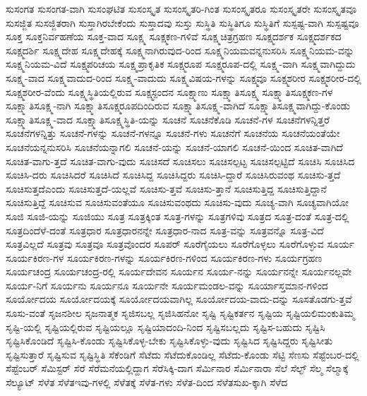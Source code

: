 {ಸುಸಂಗತ
ಸುಸಂಗತ-ವಾಗಿ
ಸುಸಂಘಟಿತ
ಸುಸಂಸ್ಕೃತ
ಸುಸಂಸ್ಕೃತರಿ-ಗಿಂತ
ಸುಸಂಸ್ಕೃತರೂ
ಸುಸಂಸ್ಕೃತರೇ
ಸುಸಂಸ್ಕೃತವೂ
ಸುಸಜ್ಜಿತ
ಸುಸಜ್ಜಿತರಾಗಿ
ಸುಸ್ತಾಗಿರಬೇಕೆಂದು
ಸುಸ್ತಾದವು
ಸುಸ್ತು
ಸುಸ್ಥಿತಿ
ಸುಸ್ಥಿತಿಗೂ
ಸುಸ್ಥಿತಿಗೆ
ಸುಸ್ಪಷ್ಟ-ವಾಗಿ
ಸುಸ್ಪಷ್ಟವೂ
ಸೂಕ್ತ
ಸೂಕ್ತನಿರ್ವಹಣೆಯ
ಸೂಕ್ತ-ವಾದ
ಸೂಕ್ಷ್ಮ
ಸೂಕ್ಷ್ಮಕಣ-ಗಳಿವೆ
ಸೂಕ್ಷ್ಮಚಿತ್ರಗ್ರಹಣ
ಸೂಕ್ಷ್ಮದರ್ಶಕ
ಸೂಕ್ಷ್ಮದರ್ಶಕದ
ಸೂಕ್ಷ್ಮದರ್ಶಿ
ಸೂಕ್ಷ್ಮದೇಹ
ಸೂಕ್ಷ್ಮದೇಹಕ್ಕೆ
ಸೂಕ್ಷ್ಮನಾಗಿರುವುದ-ರಿಂದ
ಸೂಕ್ಷ್ಮನಿಯಮವನ್ನನುಸರಿಸಿ
ಸೂಕ್ಷ್ಮನಿಯಮ-ವನ್ನು
ಸೂಕ್ಷ್ಮನಿಯಮ-ವಿದೆ
ಸೂಕ್ಷ್ಮಪರಿಚಯ
ಸೂಕ್ಷ್ಮಪ್ರಾಕೃತಿಕ
ಸೂಕ್ಷ್ಮರೂಪ
ಸೂಕ್ಷ್ಮರೂಪ-ದಲ್ಲಿ
ಸೂಕ್ಷ್ಮ-ವಾಗಿ
ಸೂಕ್ಷ್ಮವಾಗಿದ್ದುದು
ಸೂಕ್ಷ್ಮ-ವಾದ
ಸೂಕ್ಷ್ಮವಾದುದ-ರಿಂದ
ಸೂಕ್ಷ್ಮ-ವಾದುದು
ಸೂಕ್ಷ್ಮವಿಷಯ-ಗಳನ್ನು
ಸೂಕ್ಷ್ಮವೂ
ಸೂಕ್ಷ್ಮಶರೀರ
ಸೂಕ್ಷ್ಮಶರೀರ-ದಲ್ಲಿ
ಸೂಕ್ಷ್ಮಶರೀರ-ವೆಂದು
ಸೂಕ್ಷ್ಮಸ್ಥಿತಿಯಲ್ಲಿರುವ
ಸೂಕ್ಷ್ಮಸ್ಪಂದನ
ಸೂಕ್ಷ್ಮಾಣು
ಸೂಕ್ಷ್ಮಾತಿಸೂಕ್ಷ್ಮ
ಸೂಕ್ಷ್ಮಾತಿಸೂಕ್ಷ್ಮಕಣ-ಗಳ
ಸೂಕ್ಷ್ಮಾತಿಸೂಕ್ಷ್ಮ-ನಾಗಿ
ಸೂಕ್ಷ್ಮಾತಿಸೂಕ್ಷ್ಮರೂಪದಿಂದಿರುವ
ಸೂಕ್ಷ್ಮಾತಿಸೂಕ್ಷ್ಮ-ವಾಗಿದೆ
ಸೂಕ್ಷ್ಮಾತಿಸೂಕ್ಷ್ಮವಾಗಿದ್ದು-ಕೊಂಡು
ಸೂಕ್ಷ್ಮಾತಿಸೂಕ್ಷ್ಮ-ವಾದ
ಸೂಕ್ಷ್ಮಾತಿಸೂಕ್ಷ್ಮಸ್ಥಿತಿ-ಯನ್ನು
ಸೂಚನೆ
ಸೂಚನೆಕೊಡಿ
ಸೂಚನೆ-ಗಳ
ಸೂಚನೆಗಳನ್ನಿತ್ತರೆ
ಸೂಚನೆಗಳನ್ನಿತ್ತು
ಸೂಚನೆ-ಗಳನ್ನು
ಸೂಚನೆ-ಗಳನ್ನೂ
ಸೂಚನೆ-ಗಳು
ಸೂಚನೆಗೆ
ಸೂಚನೆಯ
ಸೂಚನೆಯಂತೆಯೇ
ಸೂಚನೆಯನ್ನನುಸರಿಸಿ
ಸೂಚನೆಯನ್ನಾಗಲಿ
ಸೂಚನೆ-ಯನ್ನು
ಸೂಚನೆ-ಯಾಗಲಿ
ಸೂಚನೆ-ಯಿಂದ
ಸೂಚಿತ-ವಾಗಿದೆ
ಸೂಚಿತ-ವಾಗು-ತ್ತದೆ
ಸೂಚಿತ-ವಾಗು-ವುದು
ಸೂಚಿಸದೆ
ಸೂಚಿಸಲು
ಸೂಚಿಸಲ್ಪಟ್ಟ
ಸೂಚಿಸಲ್ಪಟ್ಟಿದೆ
ಸೂಚಿಸಿ
ಸೂಚಿಸಿದ
ಸೂಚಿಸಿ-ದರು
ಸೂಚಿಸಿದರೆ
ಸೂಚಿಸಿದೆ
ಸೂಚಿಸಿದ್ದ
ಸೂಚಿಸಿದ್ದರು
ಸೂಚಿಸಿ-ದ್ದಾರೆ
ಸೂಚಿಸಿರುವಂಥ
ಸೂಚಿಸು-ತ್ತದೆ
ಸೂಚಿಸುತ್ತದೆಎಂದು
ಸೂಚಿಸುತ್ತದೆ-ಯಲ್ಲವೆ
ಸೂಚಿಸು-ತ್ತವೆ
ಸೂಚಿಸು-ತ್ತಾನೆ
ಸೂಚಿಸುತ್ತಿದ್ದ
ಸೂಚಿಸುತ್ತಿದ್ದಾನೆ
ಸೂಚಿಸುತ್ತಿದ್ದೆ
ಸೂಚಿಸುವ
ಸೂಚಿಸುವಂತೆಯೂ
ಸೂಚಿಸುವಂಥದು
ಸೂಚಿಸು-ವುದು
ಸೂಚ್ಯ-ವಾಗಿ
ಸೂಚ್ಯವಾಗಿಯೋ
ಸೂಜಿ
ಸೂಜಿ-ಯನ್ನು
ಸೂಜಿಯು
ಸೂತ್ರ
ಸೂತ್ರಕ್ಕಿಂತ
ಸೂತ್ರ-ಗಳನ್ನು
ಸೂತ್ರಗಳಿವು
ಸೂತ್ರದ
ಸೂತ್ರ-ದಂತೆ
ಸೂತ್ರ-ದಲ್ಲಿ
ಸೂತ್ರದಿಂದೆಳೆ-ದಂತೆ
ಸೂತ್ರಧಾರ
ಸೂತ್ರಧಾರನನ್ನೇ
ಸೂತ್ರಧಾರ-ನಾದ
ಸೂತ್ರ-ವನ್ನು
ಸೂತ್ರವನ್ನೊ
ಸೂತ್ರ-ವಿದೆ
ಸೂತ್ರವಿಲ್ಲದೆ
ಸೂತ್ರವು
ಸೂತ್ರವೂ
ಸೂತ್ರವೊಂದರ
ಸೂಪರ್
ಸೂರೆಗೈಯಲು
ಸೂರೆಗೊಳ್ಳಲು
ಸೂರೆಗೊಳ್ಳುವ
ಸೂರ್ಯ
ಸೂರ್ಯಕಿರಣ-ಗಳ
ಸೂರ್ಯಕಿರಣ-ಗಳನ್ನು
ಸೂರ್ಯಕಿರಣ-ಗಳಿಂದ
ಸೂರ್ಯಕಿರಣ-ಗಳು
ಸೂರ್ಯಗ್ರಹಣ
ಸೂರ್ಯಚಂದ್ರ
ಸೂರ್ಯಚಂದ್ರ-ರಲ್ಲಿ
ಸೂರ್ಯದೇವನ
ಸೂರ್ಯನ
ಸೂರ್ಯ-ನನ್ನು
ಸೂರ್ಯನನ್ನೇ
ಸೂರ್ಯನಲ್ಲವೇ
ಸೂರ್ಯ-ನಿಗೆ
ಸೂರ್ಯನು
ಸೂರ್ಯನೂ
ಸೂರ್ಯನೇ
ಸೂರ್ಯಮಂಡಲ-ವನ್ನು
ಸೂರ್ಯಾಸ್ತಮಾನ-ಗಳಿಂದ
ಸೂರ್ಯೋದಯ
ಸೂರ್ಯೋದಯಕ್ಕೆ
ಸೂರ್ಯೋದಯವಾಗಿಲ್ಲ
ಸೂರ್ಯೋದಯ-ವಾದು-ದನ್ನು
ಸೂಸತೊಡಗು-ತ್ತವೆ
ಸೂಸು-ವಂತೆ
ಸೃಜನಶೀಲ
ಸೃಜನಾತ್ಮಕ
ಸೃಜಿಸಬಲ್ಲ
ಸೃಜಿಸಿಹನೋ
ಸೃಷ್ಟಿ
ಸೃಷ್ಟಿಕರ್ತನ
ಸೃಷ್ಟಿಯ
ಸೃಷ್ಟಿಯಲಿಮಂಕುತಿಮ್ಮ
ಸೃಷ್ಟಿ-ಯಲ್ಲಿ
ಸೃಷ್ಟಿಯಲ್ಲಿರುವ
ಸೃಷ್ಟಿಯಲ್ಲೂ
ಸೃಷ್ಟಿಯಾದಂದಿ-ನಿಂದ
ಸೃಷ್ಟಿಸಬಲ್ಲದು
ಸೃಷ್ಟಿಸ-ಬಹುದು
ಸೃಷ್ಟಿಸಿ
ಸೃಷ್ಟಿಸಿಕೊಂಡಿದೆ
ಸೃಷ್ಟಿಸಿ-ಕೊಂಡು
ಸೃಷ್ಟಿಸಿಕೊಳ್ಳ-ಬೇಕು
ಸೃಷ್ಟಿಸಿಕೊಳ್ಳು-ವುದು
ಸೃಷ್ಟಿಸಿದ
ಸೃಷ್ಟಿಸಿದ್ದರು
ಸೃಷ್ಟಿಸೀತು
ಸೃಷ್ಟಿಸುತ್ತಾರೆ
ಸೃಷ್ಟಿಸುವ
ಸೃಷ್ಟಿಸ್ಥಿತಿ
ಸೆಕೆಂಡಿಗೆ
ಸೆಟೆದು
ಸೆಟೆದುಕೊಂಡಿಲ್ಲ
ಸೆಟೆದು-ಕೊಂಡು
ಸೆಟ್ಟಿ
ಸೆಣಸು
ಸೆಪ್ಟೆಂಬರ-ದಲ್ಲಿ
ಸೆಪ್ಟೆಂಬರ್
ಸೆಮಿಸ್ಟರ್
ಸೆರೆ
ಸೆರೆಮನೆಯಲ್ಲಿದ್ದಾಗ
ಸೆರೆಸಿಕ್ಕಿ-ದಾಗ
ಸೆರ್ಮಿನಾರ
ಸೆರ್ಮಿನಾರಾ
ಸೆಲೆ
ಸೆಲ್ಫ್
ಸೆಲ್ಮ
ಸೆಲ್ಮಾಕ್ಕೆ
ಸೆಲ್ಯೂಟ್
ಸೆಳೆತ
ಸೆಳೆತಇವು-ಗಳಲ್ಲಿ
ಸೆಳೆತಕ್ಕೆ
ಸೆಳೆತ-ಗಳು
ಸೆಳೆತ-ದಿಂದ
ಸೆಳೆತಸುಖ-ಕ್ಕಾಗಿ
ಸೆಳೆದ
}

